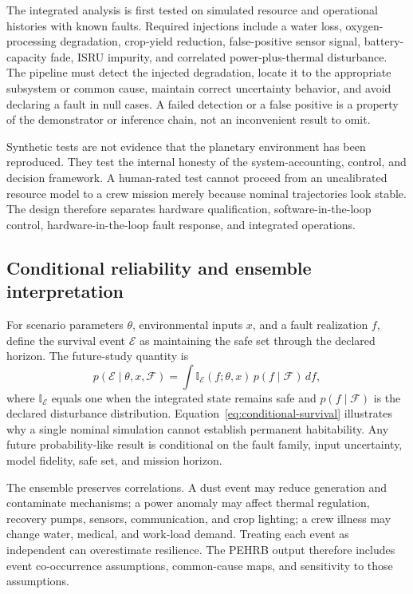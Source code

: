 \documentclass[10pt,conference]{IEEEtran}
\begin{document}
The integrated analysis is first tested on simulated resource and operational histories with known faults. Required injections include a water loss, oxygen-processing degradation, crop-yield reduction, false-positive sensor signal, battery-capacity fade, ISRU impurity, and correlated power-plus-thermal disturbance. The pipeline must detect the injected degradation, locate it to the appropriate subsystem or common cause, maintain correct uncertainty behavior, and avoid declaring a fault in null cases. A failed detection or a false positive is a property of the demonstrator or inference chain, not an inconvenient result to omit.

Synthetic tests are not evidence that the planetary environment has been reproduced. They test the internal honesty of the system-accounting, control, and decision framework. A human-rated test cannot proceed from an uncalibrated resource model to a crew mission merely because nominal trajectories look stable. The design therefore separates hardware qualification, software-in-the-loop control, hardware-in-the-loop fault response, and integrated operations.

\subsection{Conditional reliability and ensemble interpretation}

For scenario parameters $\theta$, environmental inputs $x$, and a fault realization $f$, define the survival event $\mathcal{E}$ as maintaining the safe set through the declared horizon. The future-study quantity is
\begin{equation}
p(\mathcal{E}\mid\theta,x,\mathcal{F})=\int \mathbb{I}_{\mathcal{E}}(f;\theta,x)\,p(f\mid\mathcal{F})\,df,
\label{eq:conditional-survival}
\end{equation}
where $\mathbb{I}_{\mathcal{E}}$ equals one when the integrated state remains safe and $p(f\mid\mathcal{F})$ is the declared disturbance distribution. Equation~\eqref{eq:conditional-survival} illustrates why a single nominal simulation cannot establish permanent habitability. Any future probability-like result is conditional on the fault family, input uncertainty, model fidelity, safe set, and mission horizon.

The ensemble preserves correlations. A dust event may reduce generation and contaminate mechanisms; a power anomaly may affect thermal regulation, recovery pumps, sensors, communication, and crop lighting; a crew illness may change water, medical, and work-load demand. Treating each event as independent can overestimate resilience. The PEHRB output therefore includes event co-occurrence assumptions, common-cause maps, and sensitivity to those assumptions.
\end{document}
